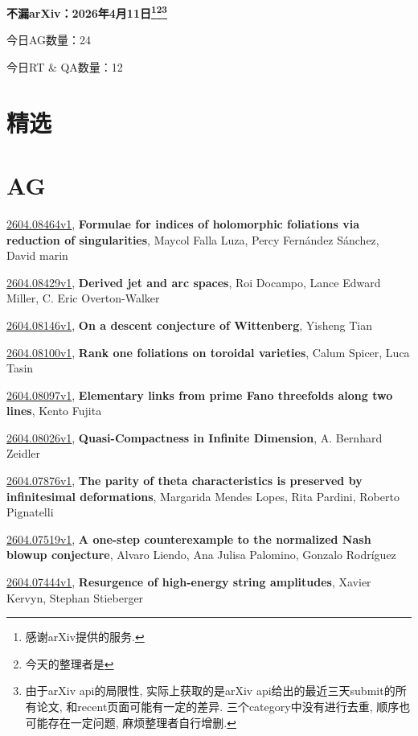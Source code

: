 \documentclass[9pt, a4paper]{article}
\theoremstyle{plain}
\theoremstyle{definition}
\theoremstyle{remark}
\newcommand{\arxiv}[3]{\href{https://arxiv.org/abs/#1}{#1}, \textbf{\textcolor{arxivblue}{#2}}, #3}
\newcommand{\AGnumber}{24}
\newcommand{\RTQAnumber}{12}
\newcommand{\NewestDate}{2026年4月11日}
\newcommand{\todayarXiver}{} %
\begin{document}
\begin{center}
    \Huge\textbf{不漏arXiv：\NewestDate\footnote{感谢arXiv提供的服务.}\footnote{今天的整理者是\todayarXiver}\footnote{由于arXiv api的局限性, 实际上获取的是arXiv api给出的最近三天submit的所有论文, 和recent页面可能有一定的差异. 三个category中没有进行去重, 顺序也可能存在一定问题, 麻烦整理者自行增删.}} \\
\end{center}

\setcounter{section}{-1}

\begin{center}
    今日AG数量：\AGnumber
    
    今日RT \& QA数量：\RTQAnumber
    
\end{center}


\section{精选}


\section{AG}
\arxiv{2604.08464v1}{Formulae for indices of holomorphic foliations via reduction of singularities}{Maycol Falla Luza, Percy Fernández Sánchez, David marin}

\arxiv{2604.08429v1}{Derived jet and arc spaces}{Roi Docampo, Lance Edward Miller, C. Eric Overton-Walker}

\arxiv{2604.08146v1}{On a descent conjecture of Wittenberg}{Yisheng Tian}

\arxiv{2604.08100v1}{Rank one foliations on toroidal varieties}{Calum Spicer, Luca Tasin}

\arxiv{2604.08097v1}{Elementary links from prime Fano threefolds along two lines}{Kento Fujita}

\arxiv{2604.08026v1}{Quasi-Compactness in Infinite Dimension}{A. Bernhard Zeidler}

\arxiv{2604.07876v1}{The parity of theta characteristics is preserved by infinitesimal deformations}{Margarida Mendes Lopes, Rita Pardini, Roberto Pignatelli}

\arxiv{2604.07519v1}{A one-step counterexample to the normalized Nash blowup conjecture}{Alvaro Liendo, Ana Julisa Palomino, Gonzalo Rodríguez}

\arxiv{2604.07444v1}{Resurgence of high-energy string amplitudes}{Xavier Kervyn, Stephan Stieberger}
\end{document}
